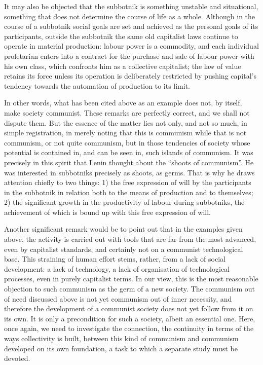 \documentclass[../main]{subfiles}
\begin{document}
It may also be objected that the subbotnik is something unstable and situational, something that does not determine the course of life as a whole. Although in the course of a subbotnik social goals are set and achieved as the personal goals of its participants, outside the subbotnik the same old capitalist laws continue to operate in material production: labour power is a commodity, and each individual proletarian enters into a contract for the purchase and sale of labour power with his own class, which confronts him as a collective capitalist; the law of value retains its force unless its operation is deliberately restricted by pushing capital’s tendency towards the automation of production to its limit.

In other words, what has been cited above as an example does not, by itself, make society communist. These remarks are perfectly correct, and we shall not dispute them. But the essence of the matter lies not only, and not so much, in simple registration, in merely noting that this is communism while that is not communism, or not quite communism, but in those tendencies of society whose potential is contained in, and can be seen in, such islands of communism. It was precisely in this spirit that Lenin thought about the “shoots of communism”. He was interested in subbotniks precisely as shoots, as germs. That is why he draws attention chiefly to two things: 1) the free expression of will by the participants in the subbotnik in relation both to the means of production and to themselves; 2) the significant growth in the productivity of labour during subbotniks, the achievement of which is bound up with this free expression of will.

Another significant remark would be to point out that in the examples given above, the activity is carried out with tools that are far from the most advanced, even by capitalist standards, and certainly not on a communist technological base. This straining of human effort stems, rather, from a lack of social development: a lack of technology, a lack of organisation of technological processes, even in purely capitalist terms. In our view, this is the most reasonable objection to such communism as the germ of a new society. The communism out of need discussed above is not yet communism out of inner necessity, and therefore the development of a communist society does not yet follow from it on its own. It is only a precondition for such a society, albeit an essential one. Here, once again, we need to investigate the connection, the continuity in terms of the ways collectivity is built, between this kind of communism and communism developed on its own foundation, a task to which a separate study must be devoted.
\end{document}
